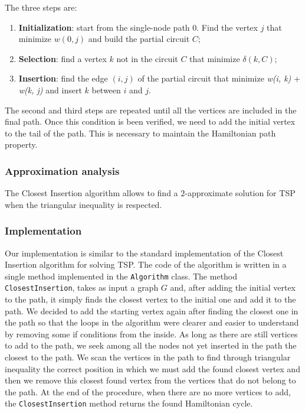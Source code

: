 The three steps are:
\begin{enumerate}
    \item \textbf{Initialization}: start from the single-node path 0. Find the vertex $j$ that minimize $w(0, j)$ and build the partial circuit $C$;
    \item \textbf{Selection}: find a vertex $k$ not in the circuit $C$ that minimize $\delta(k, C)$;
    \item \textbf{Insertion}: find the edge $(i, j)$ of the partial circuit that minimize \textit{w(i, k)} + \textit{w(k, j)}  and insert $k$ between $i$ and $j$.
\end{enumerate}
The second and third steps are repeated until all the vertices are included in the final path. Once this condition is been verified, we need to add the initial vertex to the tail of the path. This is necessary to maintain the Hamiltonian path property.

\subsubsection{Approximation analysis}
The Closest Insertion algorithm allows to find a $2$-approximate solution for TSP when the triangular inequality is respected.

\subsubsection{Implementation}
Our implementation is similar to the standard implementation of the Closest Insertion algorithm for solving TSP. The code of the algorithm is written in a single method implemented in the \verb|Algorithm| class.
The method \verb|ClosestInsertion|, takes as input a graph $G$ and, after adding the initial vertex to the path, it simply finds the closest vertex to the initial one and add it to the path. We decided to add the starting vertex again after finding the closest one in the path so that the loops in the algorithm were clearer and easier to understand by removing some if conditions from the inside. As long as there are still vertices to add to the path, we seek among all the nodes not yet inserted in the path the closest to the path. We scan the vertices in the path to find through triangular inequality the correct position in which we must add the found closest vertex and then we remove this closest found vertex from the vertices that do not belong to the path. At the end of the procedure, when there are no more vertices to add, the \verb|ClosestInsertion| method returns the found Hamiltonian cycle.

